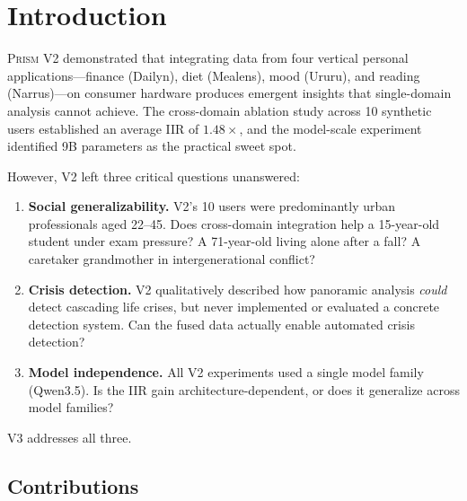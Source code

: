 \documentclass[11pt,a4paper]{article}
\newcommand{\echostream}{\textsc{Prism}}
\newcommand{\iir}{\textsc{IIR}}
\newcommand{\appname}[1]{\textsf{#1}}
\begin{document}
\section{Introduction}
\label{sec:intro}

\echostream{} V2 \citep{prism_v2} demonstrated that integrating data from
four vertical personal applications---finance (\appname{Dailyn}), diet
(\appname{Mealens}), mood (\appname{Ururu}), and reading
(\appname{Narrus})---on consumer hardware produces emergent insights that
single-domain analysis cannot achieve. The cross-domain ablation study across
10 synthetic users established an average \iir{} of $1.48\times$, and the
model-scale experiment identified 9B parameters as the practical sweet spot.

However, V2 left three critical questions unanswered:

\begin{enumerate}[leftmargin=*,itemsep=2pt]
  \item \textbf{Social generalizability.} V2's 10 users were predominantly
    urban professionals aged 22--45. Does cross-domain integration help a
    15-year-old student under exam pressure? A 71-year-old living alone after
    a fall? A caretaker grandmother in intergenerational conflict?

  \item \textbf{Crisis detection.} V2 qualitatively described how panoramic
    analysis \emph{could} detect cascading life crises, but never implemented
    or evaluated a concrete detection system. Can the fused data actually
    enable automated crisis detection?

  \item \textbf{Model independence.} All V2 experiments used a single model
    family (Qwen3.5). Is the \iir{} gain architecture-dependent, or does it
    generalize across model families?
\end{enumerate}

V3 addresses all three.

\subsection{Contributions}
\end{document}
